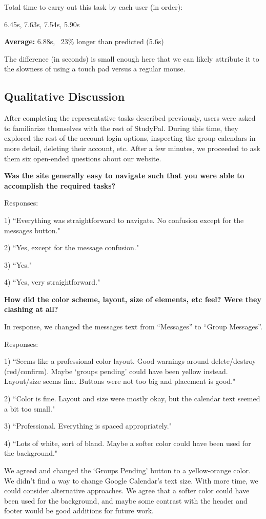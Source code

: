 \documentclass[conference]{IEEEtran}
\begin{document}
Total time to carry out this task by each user (in order):

6.45s, 7.63s, 7.54s, 5.90s

\textbf{Average:} 6.88s, ~23\% longer than predicted (5.6s)

The difference (in seconds) is small enough here that we can likely attribute it to the slowness of using a touch pad versus a regular mouse.


\subsection{Qualitative Discussion}
After completing the representative tasks described previously, users were asked to familiarize themselves with the rest of StudyPal.  During this time, they explored the rest of the account login options, inspecting the group calendars in more detail, deleting their account, etc.  After a few minutes, we proceeded to ask them six open-ended questions about our website.

\textbf{Was the site generally easy to navigate such that you were able to accomplish the required tasks?}

Responses:

1) ``Everything was straightforward to navigate.  No confusion except for the messages button."

2) ``Yes, except for the message confusion."

3) ``Yes."

4) ``Yes, very straightforward."

\textbf{How did the color scheme, layout, size of elements, etc feel?  Were they clashing at all?}

In response, we changed the messages text from ``Messages'' to ``Group Messages''.

Responses:

1) ``Seems like a professional color layout.  Good warnings around delete/destroy (red/confirm).  Maybe `groups pending' could have been yellow instead. Layout/size seems fine.  Buttons were not too big and placement is good."

2) ``Color is fine. Layout and size were mostly okay, but the calendar text seemed a bit too small."

3) ``Professional. Everything is spaced appropriately."

4) ``Lots of white, sort of bland.  Maybe a softer color could have been used for the background."

We agreed and changed the `Groups Pending' button to a yellow-orange color.  We didn't find a way to change Google Calendar's text size.  With more time, we could consider alternative approaches.  We agree that a softer color could have been used for the background, and maybe some contrast with the header and footer would be good additions for future work.
\end{document}

